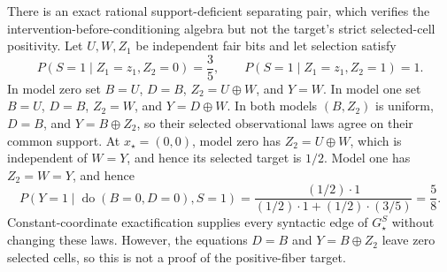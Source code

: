 There is an exact rational support-deficient separating pair, which verifies the intervention-before-conditioning algebra but not the target's strict selected-cell positivity.  Let \(U,W,Z_1\) be independent fair bits and let selection satisfy
\[
 P(S=1\mid Z_1=z_1,Z_2=0)=\frac35,
 \qquad
 P(S=1\mid Z_1=z_1,Z_2=1)=1.
\]
In model zero set \(B=U\), \(D=B\), \(Z_2=U\oplus W\), and \(Y=W\).  In model one set \(B=U\), \(D=B\), \(Z_2=W\), and \(Y=D\oplus W\).  In both models \((B,Z_2)\) is uniform, \(D=B\), and \(Y=B\oplus Z_2\), so their selected observational laws agree on their common support.  At \(x_\star=(0,0)\), model zero has \(Z_2=U\oplus W\), which is independent of \(W=Y\), and hence its selected target is \(1/2\).  Model one has \(Z_2=W=Y\), and hence
\[
 P(Y=1\mid\operatorname{do}(B=0,D=0),S=1)
 =\frac{(1/2)\cdot1}{(1/2)\cdot1+(1/2)\cdot(3/5)}=\frac58.
\]
Constant-coordinate exactification supplies every syntactic edge of \(G_\star^S\) without changing these laws.  However, the equations \(D=B\) and \(Y=B\oplus Z_2\) leave zero selected cells, so this is not a proof of the positive-fiber target.